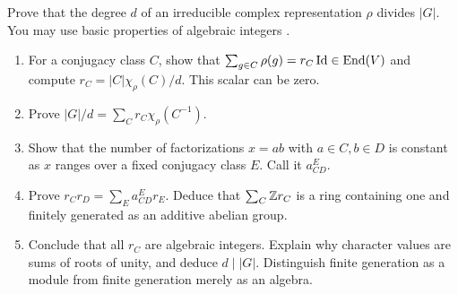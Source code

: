 
\begin{exo}
\label{exo-representation-theory-numbers}
Prove that the degree $d$ of an irreducible complex representation $\rho$
divides $|G|$. You may use basic properties of algebraic integers
\cite{samuel}.
\begin{enumerate}
\item For a conjugacy class $C$, show that
$\sum_{g\in C}\rho(g)=r_C\operatorname{Id}\in\operatorname{End}(V)$ and compute
$r_C=|C|\chi_\rho(C)/d$. This scalar can be zero.
\item Prove $|G|/d=\sum_C r_C\chi_\rho(C^{-1})$.
\item Show that the number of factorizations $x=ab$ with $a\in C,b\in D$
is constant as $x$ ranges over a fixed conjugacy class $E$. Call it
$a_{CD}^E$.
\item Prove $r_Cr_D=\sum_Ea_{CD}^Er_E$. Deduce that
$\sum_C\mathbb{Z} r_C$ is a ring containing one and finitely generated as
an additive abelian group.
\item Conclude that all $r_C$ are algebraic integers. Explain why
character values are sums of roots of unity, and deduce $d\mid|G|$.
Distinguish finite generation as a module from finite generation merely
as an algebra.
\end{enumerate}
\end{exo}


